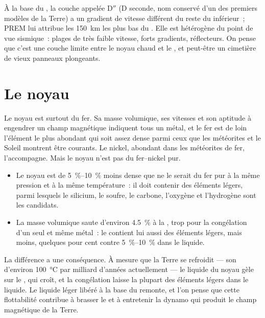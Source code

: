 À la base du , la couche appelée D$''$ (D seconde, nom conservé d'un des
premiers modèles de la Terre) a un gradient de vitesse différent du reste du
 inférieur~; PREM lui attribue les \qty{150}{km} les plus bas du .
Elle est hétérogène du point de vue sismique~: plages de très faible vitesse,
forts gradients, réflecteurs. On pense que c'est une couche limite entre le noyau
chaud et le , et peut-être un cimetière de vieux panneaux plongeants.

\section{Le noyau}

Le noyau est surtout du fer. Sa masse volumique, ses vitesses et son aptitude à
engendrer un champ magnétique indiquent tous un métal, et le fer est de loin
l'élément le plus abondant qui soit assez dense parmi ceux que les météorites et
le Soleil montrent être courants. Le nickel, abondant dans les météorites de fer,
l'accompagne. Mais le noyau n'est pas du fer--nickel pur.
\begin{itemize}
  \item Le noyau est de \qtyrange{5}{10}{\percent} moins dense que ne le serait du
        fer pur à la même pression et à la même température~: il doit contenir
        des éléments légers, parmi lesquels le silicium, le soufre, le carbone,
        l'oxygène et l'hydrogène sont les candidats.
  \item La masse volumique saute d'environ \qty{4.5}{\percent} à la , trop pour la congélation d'un seul et même métal~: le
         contient lui aussi des éléments légers, mais moins, quelques
        pour cent contre \qtyrange{5}{10}{\percent} dans le liquide.
\end{itemize}
La différence a une conséquence. À mesure que la Terre se refroidit --- son 
d'environ \qty{100}{\degreeCelsius} par milliard d'années actuellement --- le
liquide du noyau gèle sur le , qui croît, et
la congélation laisse la plupart des éléments légers dans le liquide. Le liquide
léger libéré à la base du  remonte, et l'on pense que cette
flottabilité contribue à brasser le  et à entretenir la dynamo qui
produit le champ magnétique de la Terre.

